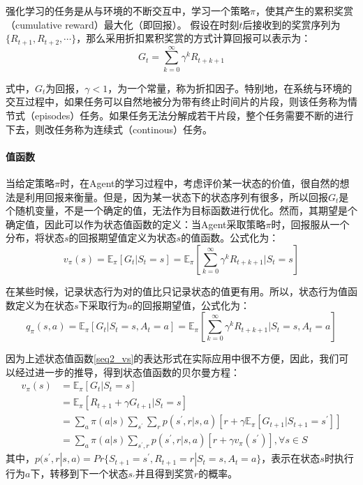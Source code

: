 强化学习的任务是从与环境的不断交互中，学习一个策略$\pi$，使其产生的累积奖赏（cumulative reward）最大化（即回报）。
假设在时刻$t$后接收到的奖赏序列为$\{R_{t+1}, R_{t+2},\cdots\}$，那么采用折扣累积奖赏的方式计算回报可以表示为：
\begin{equation}\label{seq:reward}
G_{t}=\sum_{k=0}^{\infty}\gamma^{k}R_{t+k+1}
\end{equation}

式中，$G_{t}$为回报，$\gamma<1$，为一个常量，称为折扣因子。特别地，在系统与环境的交互过程中，如果任务可以自然地被分为带有终止时间片的片段，则该任务称为情节式（episodes）任务。如果任务无法分解成若干片段，整个任务需要不断的进行下去，则改任务称为连续式（continous）任务。

\paragraph{值函数}
当给定策略$\pi$时，在Agent的学习过程中，考虑评价某一状态的价值，很自然的想法是利用回报来衡量。但是，因为某一状态下的状态序列有很多，所以回报$G_{t}$是个随机变量，不是一个确定的值，无法作为目标函数进行优化。然而，其期望是个确定值，因此可以作为状态值函数的定义：当Agent采取策略$\pi$时，回报服从一个分布，将状态$s$的回报期望值定义为状态$s$的值函数。公式化为：
\begin{equation}
\label{seq2_vs}
v_{\pi}(s)=\mathbb{E}_{\pi}[G_{t}|S_t=s]=\mathbb{E}_{\pi}[\sum_{k=0}^{\infty}\gamma^{k}R_{t+k+1}|S_t=s]
\end{equation}


在某些时候，记录状态行为对的值比只记录状态的值更有用。所以，状态行为值函数定义为在状态$s$下采取行为$a$的回报期望值，公式化为：
\begin{equation}
\label{seq2_qsa}
q_{\pi}(s,a)=\mathbb{E}_{\pi}[G_{t}|S_t=s,A_t=a]
=\mathbb{E}_{\pi}[\sum_{k=0}^{\infty}\gamma^{k}R_{t+k+1}|S_t=s,A_t=a]
\end{equation}

因为上述状态值函数\eqref{seq2_vs}的表达形式在实际应用中很不方便，因此，我们可以经过进一步的推导，得到状态值函数的贝尔曼方程：
\begin{equation}
\label{seq1}
\begin{aligned}
v_{\pi}(s)&=\mathbb{E}_{\pi}[G_{t}|S_t=s]\\
&=\mathbb{E}_{\pi}[R_{t+1}+\gamma G_{t+1}|S_t=s]\\
&=\sum_{a}\pi(a|s)\sum_{s^{'}}\sum_{r}p(s^{'},r|s,a)[r + \gamma\mathbb{E}_{\pi}[G_{t+1}|S_{t+1}=s^{'}]]\\
&=\sum_{a}\pi(a|s)\sum_{s^{'},r}p(s^{'},r|s,a)[r+\gamma v_{\pi}(s^{'})], \forall s \in S
\end{aligned}
\end{equation}
其中，$p(s^{'},r|s,a) = Pr\{S_{t+1}=s^{'}, R_{t+1}=r|S_{t}=s, A_{t}=a\}$，表示在状态$s$时执行行为$a$下，转移到下一个状态$s_{'}$并且得到奖赏$r$的概率。

